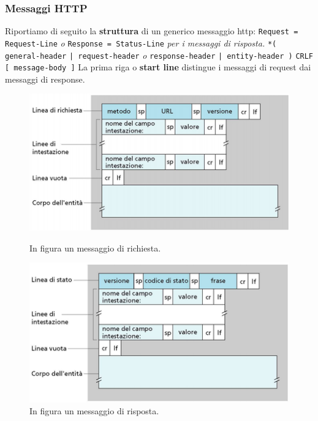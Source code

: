 \documentclass[11pt,a4paper,oneside]{book}
\theoremstyle{definition}
\begin{document}
\subsubsection{Messaggi HTTP}
Riportiamo di seguito la \textbf{struttura} di un generico messaggio http:\newline
\texttt{Request = Request-Line} \textit{o} \texttt{Response = Status-Line} \textit{per i messaggi di risposta.}\newline
\texttt{*( general-header}\newline
\texttt{| request-header} \textit{o} \texttt{response-header}\newline
\texttt{| entity-header )}\newline
\texttt{CRLF}\newline
\texttt{[ message-body ]}\newline
La prima riga o \textbf{start line} distingue i messaggi di request dai messaggi di response.
\begin{figure}[!h]
	\centering
	\begin{minipage}[b]{0.4\textwidth}
		\includegraphics[scale=0.4]{Immagini/Http_req.png}
		\caption{In figura un messaggio di richiesta.}
	\end{minipage}
	\hfill
	\begin{minipage}[b]{0.4\textwidth}
		\includegraphics[scale=0.4]{Immagini/Http_res.png}
		\caption{In figura un messaggio di risposta.}
	\end{minipage}
\end{figure}
\end{document}
